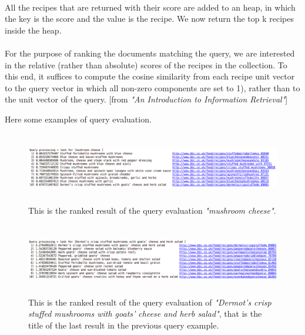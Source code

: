 \documentclass[oneside]{article}			%
\begin{document}
	\\
	All the recipes that are returned with their score are added to an heap, in which the key is the score and the value is the recipe. We now return the top k recipes inside the heap.
	\\\\
	For the purpose of ranking the documents matching the query, we are interested in the relative (rather than absolute) scores of the recipes in the collection. To this end, it suffices to compute the cosine similarity from each recipe unit vector to the query vector in which all non-zero components are set to 1), rather than to the unit vector of the query. [from \textit{"An Introduction to Information Retrieval"}]

	\clearpage
	Here some examples of query evaluation.
	\\
	\begin{figure}[h]
		\includegraphics[width=18cm, height=3.1cm]{./report_file/img/4_3_1_ex.png}\caption{This is the ranked result of the query evaluation \textit{"mushroom cheese"}.}
	\end{figure}
	\begin{figure}[h]
		\includegraphics[width=18cm, height=3.1cm]{./report_file/img/4_3_2_ex.png}\caption{This is the ranked result of the query evaluation of \textit{"Dermot's crisp stuffed mushrooms with goats' cheese and herb salad"}, that is the title of the last result in the previous query example.}
	\end{figure}

	\clearpage
\end{document}
